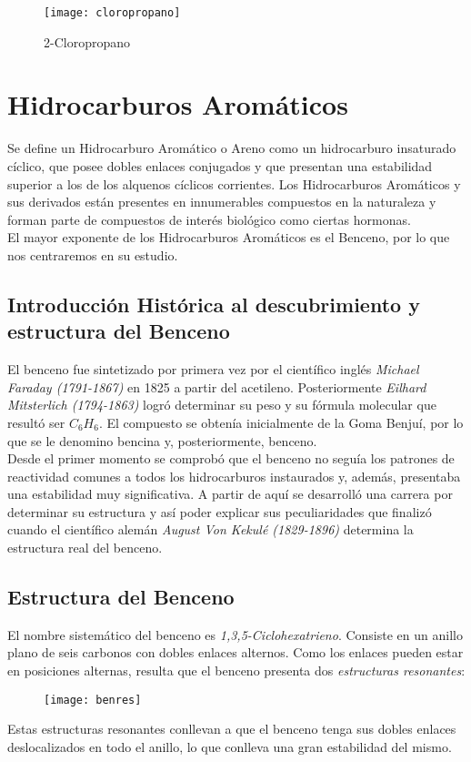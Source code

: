 \begin{figure}[h!]
	\centering
	\texttt{[image: cloropropano]}
	\captionsetup{labelformat=empty}
	\caption{2-Cloropropano}
\end{figure}
\section{Hidrocarburos Aromáticos}

Se define un Hidrocarburo Aromático o Areno como un hidrocarburo insaturado cíclico, que posee dobles enlaces conjugados y que presentan una estabilidad superior a los de los alquenos cíclicos corrientes. Los Hidrocarburos Aromáticos y sus derivados están presentes en innumerables compuestos en la naturaleza y forman parte de compuestos de interés biológico como ciertas hormonas.\\

El mayor exponente de los Hidrocarburos Aromáticos es el Benceno, por lo que nos centraremos en su estudio.

\subsection{Introducción Histórica al descubrimiento y estructura del Benceno}

El benceno fue sintetizado por primera vez por el científico inglés \emph{Michael Faraday (1791-1867)} en 1825 a partir del acetileno. Posteriormente \emph{Eilhard Mitsterlich (1794-1863)} logró determinar su peso y su fórmula molecular que resultó ser $C_6H_6$. El compuesto se obtenía inicialmente de la Goma Benjuí, por lo que se le denomino bencina y, posteriormente, benceno.\\

Desde el primer momento se comprobó que el benceno no seguía los patrones de reactividad comunes a todos los hidrocarburos instaurados y, además, presentaba una estabilidad muy significativa. A partir de aquí se desarrolló una carrera por determinar su estructura y así  poder explicar sus peculiaridades que finalizó cuando el científico alemán \emph{August Von Kekulé (1829-1896)} determina la estructura real del benceno.
 
\subsection{Estructura del Benceno}

El nombre sistemático del benceno es \emph{1,3,5-Ciclohexatrieno}. Consiste en un anillo plano de seis carbonos con dobles enlaces alternos. Como los enlaces pueden estar en posiciones alternas, resulta que el benceno presenta dos \emph{estructuras resonantes}:
\begin{figure}[h!]
	\centering
	\texttt{[image: benres]}
\end{figure}
Estas estructuras resonantes conllevan a que el benceno tenga sus dobles enlaces deslocalizados en todo el anillo, lo que conlleva una gran estabilidad del mismo.

